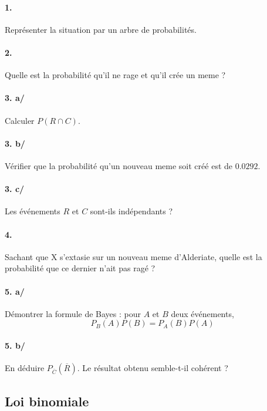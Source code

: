 		\paragraph{1.} Représenter la situation par un arbre de probabilités.
		
		\paragraph{2.} Quelle est la probabilité qu'il ne rage et qu'il crée un meme ?
		
		\paragraph{3. a/} Calculer $P(R\cap C)$.
		
		\paragraph{3. b/} Vérifier que la probabilité qu'un nouveau meme soit créé est de $0.0292$.
		
		\paragraph{3. c/} Les événements $R$ et $C$ sont-ils indépendants ?

		\paragraph{4.} Sachant que X s'extasie sur un nouveau meme d'Alderiate, quelle est la probabilité que ce dernier n'ait pas ragé ?
		
		\paragraph{5. a/} Démontrer la formule de Bayes : pour $A$ et $B$ deux événements, 
		\[
			P_B(A) P(B) = P_A(B) P(A)
		\]
		
		\paragraph{5. b/} En déduire $P_{\overline{C}}(\overline{R})$. Le résultat obtenu semble-t-il cohérent ?\\
		
		
		\subsection{Loi binomiale}
		
